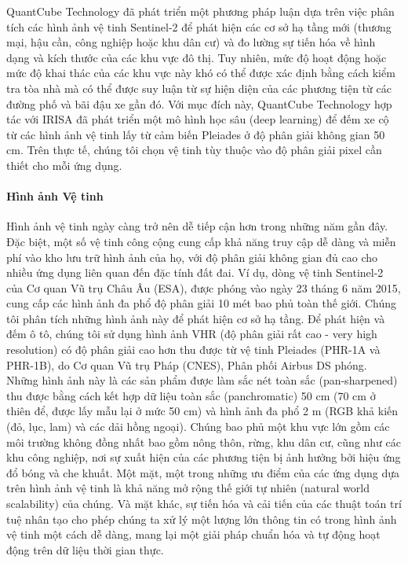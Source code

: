 QuantCube Technology đã phát triển một phương pháp luận dựa trên việc phân tích các hình ảnh vệ tinh Sentinel-2 để phát hiện các cơ sở hạ tầng mới (thương mại, hậu cần, công nghiệp hoặc khu dân cư) và đo lường sự tiến hóa về hình dạng và kích thước của các khu vực đô thị. Tuy nhiên, mức độ hoạt động hoặc mức độ khai thác của các khu vực này khó có thể được xác định bằng cách kiểm tra tòa nhà mà có thể được suy luận từ sự hiện diện của các phương tiện từ các đường phố và bãi đậu xe gần đó. Với mục đích này, QuantCube Technology hợp tác với IRISA đã phát triển một mô hình học sâu (deep learning) để đếm xe cộ từ các hình ảnh vệ tinh lấy từ cảm biến Pleiades ở độ phân giải không gian 50 cm. Trên thực tế, chúng tôi chọn vệ tinh tùy thuộc vào độ phân giải pixel cần thiết cho mỗi ứng dụng.

\paragraph{Hình ảnh Vệ tinh}
Hình ảnh vệ tinh ngày càng trở nên dễ tiếp cận hơn trong những năm gần đây. Đặc biệt, một số vệ tinh công cộng cung cấp khả năng truy cập dễ dàng và miễn phí vào kho lưu trữ hình ảnh của họ, với độ phân giải không gian đủ cao cho nhiều ứng dụng liên quan đến đặc tính đất đai. Ví dụ, dòng vệ tinh Sentinel-2 của Cơ quan Vũ trụ Châu Âu (ESA), được phóng vào ngày 23 tháng 6 năm 2015, cung cấp các hình ảnh đa phổ độ phân giải 10 mét bao phủ toàn thế giới. Chúng tôi phân tích những hình ảnh này để phát hiện cơ sở hạ tầng. Để phát hiện và đếm ô tô, chúng tôi sử dụng hình ảnh VHR (độ phân giải rất cao - very high resolution) có độ phân giải cao hơn thu được từ vệ tinh Pleiades (PHR-1A và PHR-1B), do Cơ quan Vũ trụ Pháp (CNES), Phân phối Airbus DS phóng. Những hình ảnh này là các sản phẩm được làm sắc nét toàn sắc (pan-sharpened) thu được bằng cách kết hợp dữ liệu toàn sắc (panchromatic) 50 cm (70 cm ở thiên để, được lấy mẫu lại ở mức 50 cm) và hình ảnh đa phổ 2 m (RGB khả kiến (đỏ, lục, lam) và các dải hồng ngoại). Chúng bao phủ một khu vực lớn gồm các môi trường không đồng nhất bao gồm nông thôn, rừng, khu dân cư, cũng như các khu công nghiệp, nơi sự xuất hiện của các phương tiện bị ảnh hưởng bởi hiệu ứng đổ bóng và che khuất. Một mặt, một trong những ưu điểm của các ứng dụng dựa trên hình ảnh vệ tinh là khả năng mở rộng thế giới tự nhiên (natural world scalability) của chúng. Và mặt khác, sự tiến hóa và cải tiến của các thuật toán trí tuệ nhân tạo cho phép chúng ta xử lý một lượng lớn thông tin có trong hình ảnh vệ tinh một cách dễ dàng, mang lại một giải pháp chuẩn hóa và tự động hoạt động trên dữ liệu thời gian thực.

